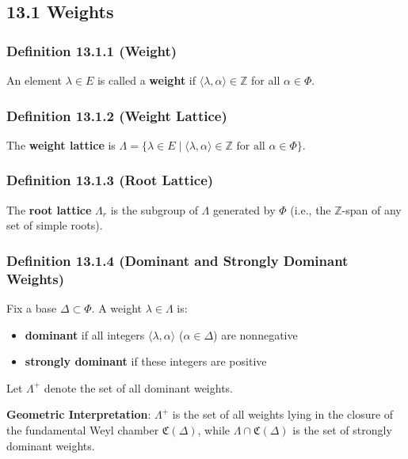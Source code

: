 \subsection{13.1 Weights}

\subsubsection{Definition 13.1.1 (Weight)}

An element $\lambda \in E$ is called a \textbf{weight} if $\langle\lambda, \alpha\rangle \in \mathbb{Z}$ for all $\alpha \in \Phi$.

\subsubsection{Definition 13.1.2 (Weight Lattice)}

The \textbf{weight lattice} is $\Lambda = \{\lambda \in E \mid \langle\lambda, \alpha\rangle \in \mathbb{Z} \text{ for all } \alpha \in \Phi\}$.

\subsubsection{Definition 13.1.3 (Root Lattice)}

The \textbf{root lattice} $\Lambda_r$ is the subgroup of $\Lambda$ generated by $\Phi$ (i.e., the $\mathbb{Z}$-span of any set of simple roots).

\subsubsection{Definition 13.1.4 (Dominant and Strongly Dominant Weights)}

Fix a base $\Delta \subset \Phi$. A weight $\lambda \in \Lambda$ is:

\begin{itemize}
	\item \textbf{dominant} if all integers $\langle\lambda, \alpha\rangle$ ($\alpha \in \Delta$) are nonnegative
	\item \textbf{strongly dominant} if these integers are positive
\end{itemize}

Let $\Lambda^+$ denote the set of all dominant weights.

\textbf{Geometric Interpretation}: $\Lambda^+$ is the set of all weights lying in the closure of the fundamental Weyl chamber $\mathfrak{C}(\Delta)$, while $\Lambda \cap \mathfrak{C}(\Delta)$ is the set of strongly dominant weights.

